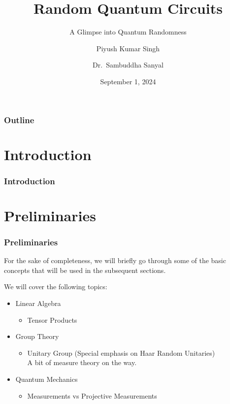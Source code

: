 \documentclass[11pt, xcolor={dvipsnames, svgnames, table, x11names}, color]{beamer}
\title{Random Quantum Circuits}
\subtitle{A Glimpse into Quantum Randomness}
\author[Piyush Kumar Singh]{Piyush Kumar Singh\inst{1} \and Dr.~Sambuddha Sanyal\inst{2}}
\institute[22MS027]{
    \inst{1}%
    Department of Physical Sciences\\
    IISER Kolkata
    \and
    \inst{2}%
    Department of Physical Sciences\\
    IISER Tirupati
    \and
    NIUS Physics (Camp 20)
}
\date{September 1, 2024}
\begin{document}
\begin{frame}
    \titlepage
\end{frame}


\begin{frame}
    \frametitle{Outline}
    \tableofcontents
\end{frame}


\section{Introduction}
\begin{frame}
    \frametitle{Introduction}
\end{frame}


\section{Preliminaries}
\begin{frame}
    \frametitle{Preliminaries}
    For the sake of completeness, we will briefly go through some of the basic concepts that will be used in the subsequent sections.

    We will cover the following topics:
    \begin{itemize}
        \item Linear Algebra
              \begin{itemize}
                  \item Tensor Products
              \end{itemize}
        \item Group Theory
              \begin{itemize}
                  \item Unitary Group (Special emphasis on Haar Random Unitaries)\\
                        A bit of \alert{measure theory} on the way.
              \end{itemize}
        \item Quantum Mechanics
              \begin{itemize}
                  \item Measurements vs Projective Measurements
              \end{itemize}
    \end{itemize}
\end{frame}
\end{document}
